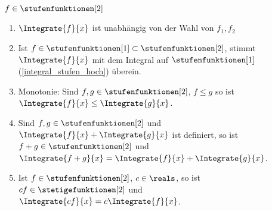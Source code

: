 \begin{satz}\label{r2_eigenschaften}
  \( f\in \stufenfunktionen[2] \)
  \begin{enumerate}
    \item \label{integral_r2_unabhaengig_von_r1_wahl} \( \Integrate{f}{x} \) ist unabhängig von der Wahl von \( f_1,f_2 \)
    \item \label{integral_r2_stimmt_mit_integral_r1_ueberein} Ist \( f\in \stufenfunktionen[1]\subset \stufenfunktionen[2] \), stimmt \( \Integrate{f}{x} \) mit dem Integral auf \( \stufenfunktionen[1]\) (\ref{integral_stufen_hoch}) überein.
    \item \label{integral_r2_monotonie} Monotonie: Sind \( f,g\in \stufenfunktionen[2] \), \( f\leq g \) so ist \( \Integrate{f}{x}\leq \Integrate{g}{x} \).
    \item \label{summe_r2} Sind \( f,g\in \stufenfunktionen[2] \) und \( \Integrate{f}{x}+\Integrate{g}{x} \) ist definiert, so ist \( f+g\in \stufenfunktionen[2] \) und \( \Integrate{f+g}{x}=\Integrate{f}{x}+\Integrate{g}{x} \).
    \item \label{skalarmultiplikation_r2} Ist \( f\in \stufenfunktionen[2] \), \( c\in \reals \), so ist \( cf\in \stetigefunktionen[2] \) und \( \Integrate{cf}{x}=c\Integrate{f}{x} \).
  \end{enumerate}
\end{satz}
